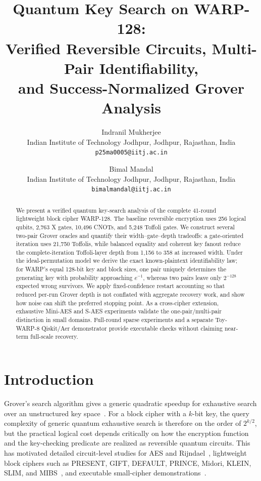 \documentclass[10pt,a4paper]{article}
\title{\textbf{Quantum Key Search on WARP-128:}\\
Verified Reversible Circuits, Multi-Pair Identifiability,\\
and Success-Normalized Grover Analysis}
\author{
Indranil Mukherjee\\
\small Indian Institute of Technology Jodhpur, Jodhpur, Rajasthan, India\\
\small \texttt{p25ma0005@iitj.ac.in}
\and
Bimal Mandal\\
\small Indian Institute of Technology Jodhpur, Jodhpur, Rajasthan, India\\
\small \texttt{bimalmandal@iitj.ac.in}
}
\date{}
\begin{document}
\maketitle

\begin{abstract}
We present a verified quantum key-search analysis of the complete 41-round lightweight block cipher WARP-128. The baseline reversible encryption uses 256 logical qubits, 2,763 X gates, 10,496 CNOTs, and 5,248 Toffoli gates. We construct several two-pair Grover oracles and quantify their width--gate--depth tradeoffs: a gate-oriented iteration uses 21,750 Toffolis, while balanced equality and coherent key fanout reduce the complete-iteration Toffoli-layer depth from 1,156 to 358 at increased width. Under the ideal-permutation model we derive the exact known-plaintext identifiability law; for WARP's equal 128-bit key and block sizes, one pair uniquely determines the generating key with probability approaching $e^{-1}$, whereas two pairs leave only $2^{-128}$ expected wrong survivors. We apply fixed-confidence restart accounting so that reduced per-run Grover depth is not conflated with aggregate recovery work, and show how noise can shift the preferred stopping point. As a cross-cipher extension, exhaustive Mini-AES and S-AES experiments validate the one-pair/multi-pair distinction in small domains. Full-round sparse experiments and a separate Toy-WARP-8 Qiskit/Aer demonstrator provide executable checks without claiming near-term full-scale recovery.
\end{abstract}

\section{Introduction}

Grover's search algorithm gives a generic quadratic speedup for exhaustive search over an unstructured key space~\cite{Grover1996}. For a block cipher with a $k$-bit key, the query complexity of generic quantum exhaustive search is therefore on the order of $2^{k/2}$, but the practical logical cost depends critically on how the encryption function and the key-checking predicate are realized as reversible quantum circuits. This has motivated detailed circuit-level studies for AES and Rijndael~\cite{Grassl2016,Langenberg2020,Jaques2020,Lin2023,SongSeo2026}, lightweight block ciphers such as PRESENT, GIFT, DEFAULT, PRINCE, Midori, KLEIN, SLIM, and MIBS~\cite{Jang2021,JangDefault2025,Akhlaq2024,KLEIN2026,SLIM2025,MIBS2026}, and executable small-cipher demonstrations~\cite{Wang2025,Kiran2026}.
\end{document}
